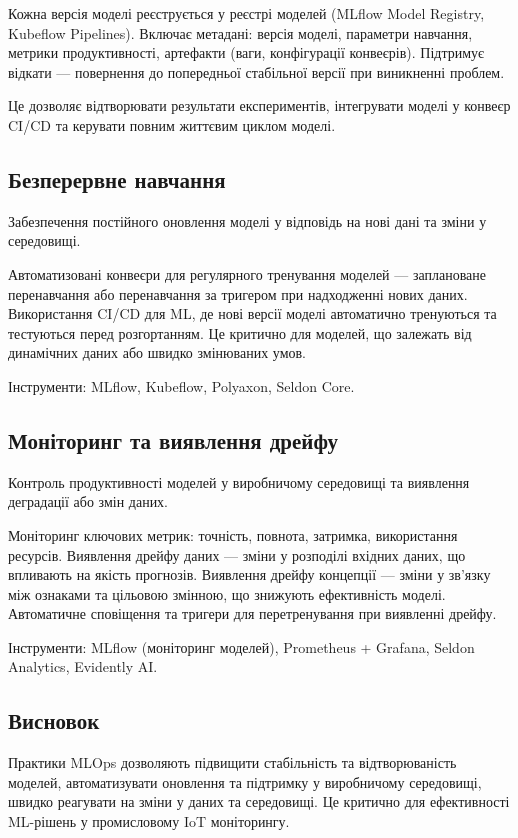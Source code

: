 Кожна версія моделі реєструється у реєстрі моделей (MLflow Model Registry, Kubeflow Pipelines). Включає метадані: версія моделі, параметри навчання, метрики продуктивності, артефакти (ваги, конфігурації конвеєрів). Підтримує відкати --- повернення до попередньої стабільної версії при виникненні проблем.

Це дозволяє відтворювати результати експериментів, інтегрувати моделі у конвеєр CI/CD та керувати повним життєвим циклом моделі.

\subsection{Безперервне навчання}

Забезпечення постійного оновлення моделі у відповідь на нові дані та зміни у середовищі.

Автоматизовані конвеєри для регулярного тренування моделей --- заплановане перенавчання або перенавчання за тригером при надходженні нових даних. Використання CI/CD для ML, де нові версії моделі автоматично тренуються та тестуються перед розгортанням. Це критично для моделей, що залежать від динамічних даних або швидко змінюваних умов.

Інструменти: MLflow, Kubeflow, Polyaxon, Seldon Core.

\subsection{Моніторинг та виявлення дрейфу}

Контроль продуктивності моделей у виробничому середовищі та виявлення деградації або змін даних.

Моніторинг ключових метрик: точність, повнота, затримка, використання ресурсів. Виявлення дрейфу даних --- зміни у розподілі вхідних даних, що впливають на якість прогнозів. Виявлення дрейфу концепції --- зміни у зв'язку між ознаками та цільовою змінною, що знижують ефективність моделі. Автоматичне сповіщення та тригери для перетренування при виявленні дрейфу.

Інструменти: MLflow (моніторинг моделей), Prometheus + Grafana, Seldon Analytics, Evidently AI.

\subsection{Висновок}

Практики MLOps дозволяють підвищити стабільність та відтворюваність моделей, автоматизувати оновлення та підтримку у виробничому середовищі, швидко реагувати на зміни у даних та середовищі. Це критично для ефективності ML-рішень у промисловому IoT моніторингу.


